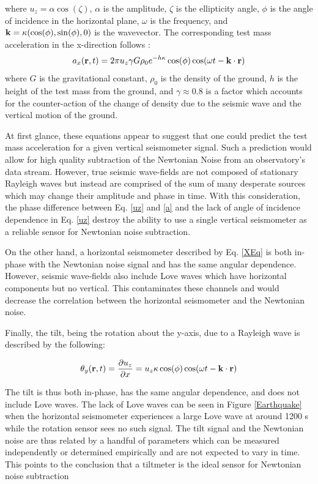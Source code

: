 \documentclass [12pt, proquest]{uwthesis}[2019]
\begin{document}
where $u_z=\alpha \cos(\zeta)$, $\alpha$ is the amplitude, $\zeta$ is the ellipticity angle, $\phi$ is the angle of incidence in the horizontal plane, $\omega$ is the frequency, and $\bf{k}=\kappa (\cos(\phi),\sin(\phi),\text{0})$ is the wavevector. The corresponding test mass acceleration in the x-direction follows \cite{Harms_2016}:
\begin{equation}
a_x({\bf r} ,t)=2 \pi u_z \gamma G \rho_0 e^{-h \kappa}  \cos(\phi) \cos(\omega t-{\bf k}\cdot{\bf r}) \label{a}
\end{equation}
where $G$ is the gravitational constant, $\rho_0$ is the density of the ground, $h$ is the height of the test mass from the ground, and $\gamma \approx 0.8$ is a factor which accounts for the counter-action of the change of density due to the seismic wave and the vertical motion of the ground.

At first glance, these equations appear to suggest that one could predict the test mass acceleration for a given vertical seismometer signal. Such a prediction would allow for high quality subtraction of the Newtonian Noise from an observatory's data stream. However, true seismic wave-fields are not composed of stationary Rayleigh waves but instead are comprised of the sum of many desperate sources which may change their amplitude and phase in time. With this consideration, the phase difference between Eq. \ref{uz} and \ref{a} and the lack of angle of incidence dependence in Eq. \ref{uz} destroy the ability to use a single vertical seismometer as a reliable sensor for Newtonian noise subtraction.

On the other hand, a horizontal seismometer described by Eq. \ref{XEq} is both in-phase with the Newtonian noise signal and has the same angular dependence. However, seismic wave-fields also include Love waves which have horizontal components but no vertical. This contaminates these channels and would decrease the correlation between the horizontal seismometer and the Newtonian noise. 

Finally, the tilt, being the rotation about the y-axis, due to a Rayleigh wave is described by the following:

\begin{equation}
\theta_y({\bf r} ,t)=\frac{\partial u_z}{\partial x}=u_z \kappa \cos(\phi) \cos(\omega t-{\bf k}\cdot{\bf r})\label{tX}\\
\end{equation}

The tilt is thus both in-phase, has the same angular dependence, and does not include Love waves. The lack of Love waves can be seen in Figure \ref{Earthquake} when the horizontal seismometer experiences a large Love wave at around 1200 s while the rotation sensor sees no such signal. The tilt signal and the Newtonian noise are thus related by a handful of parameters which can be measured independently or determined empirically and are not expected to vary in time. This points to the conclusion that a tiltmeter is the ideal sensor for Newtonian noise subtraction
\end{document}
